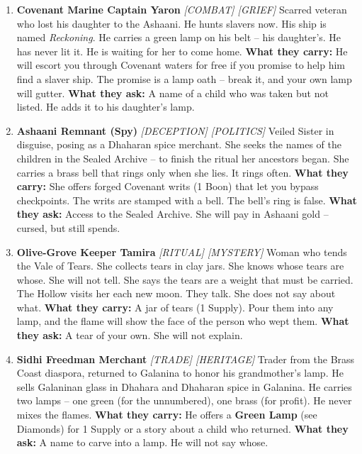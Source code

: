 \begin{enumerate}
\item \textbf{Covenant Marine Captain Yaron} \hfill \textit{[COMBAT] [GRIEF]}  
  Scarred veteran who lost his daughter to the Ashaani. He hunts slavers now. His ship is named \textit{Reckoning}. He carries a green lamp on his belt -- his daughter's. He has never lit it. He is waiting for her to come home.  
  \textbf{What they carry:} He will escort you through Covenant waters for free if you promise to help him find a slaver ship. The promise is a lamp oath -- break it, and your own lamp will gutter.  
  \textbf{What they ask:} A name of a child who was taken but not listed. He adds it to his daughter's lamp.

\item \textbf{Ashaani Remnant (Spy)} \hfill \textit{[DECEPTION] [POLITICS]}  
  Veiled Sister in disguise, posing as a Dhaharan spice merchant. She seeks the names of the children in the Sealed Archive -- to finish the ritual her ancestors began. She carries a brass bell that rings only when she lies. It rings often.  
  \textbf{What they carry:} She offers forged Covenant writs (1 Boon) that let you bypass checkpoints. The writs are stamped with a bell. The bell's ring is false.  
  \textbf{What they ask:} Access to the Sealed Archive. She will pay in Ashaani gold -- cursed, but still spends.

\item \textbf{Olive-Grove Keeper Tamira} \hfill \textit{[RITUAL] [MYSTERY]}  
  Woman who tends the Vale of Tears. She collects tears in clay jars. She knows whose tears are whose. She will not tell. She says the tears are a weight that must be carried. The Hollow visits her each new moon. They talk. She does not say about what.  
  \textbf{What they carry:} A jar of tears (1 Supply). Pour them into any lamp, and the flame will show the face of the person who wept them.  
  \textbf{What they ask:} A tear of your own. She will not explain.

\item \textbf{Sidhi Freedman Merchant} \hfill \textit{[TRADE] [HERITAGE]}  
  Trader from the Brass Coast diaspora, returned to Galanina to honor his grandmother's lamp. He sells Galaninan glass in Dhahara and Dhaharan spice in Galanina. He carries two lamps -- one green (for the unnumbered), one brass (for profit). He never mixes the flames.  
  \textbf{What they carry:} He offers a \textbf{Green Lamp} (see Diamonds) for 1 Supply or a story about a child who returned.  
  \textbf{What they ask:} A name to carve into a lamp. He will not say whose.


\end{enumerate}
